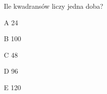 \begin{tresc}
Ile kwadransów liczy jedna doba?
\end{tresc}
\begin{wariant}{A} 24 \end{wariant}
\begin{wariant}{B} 100 \end{wariant}
\begin{wariant}{C} 48 \end{wariant}
\begin{wariant}{D} 96 \end{wariant}
\begin{wariant}{E} 120 \end{wariant}
